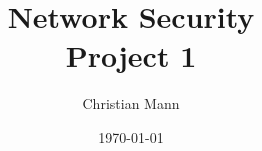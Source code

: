 \documentclass{article}
\title{Network Security\\Project 1}
\author{Christian Mann}
\date{\today}
\begin{document}
	\section{}
\end{document}
